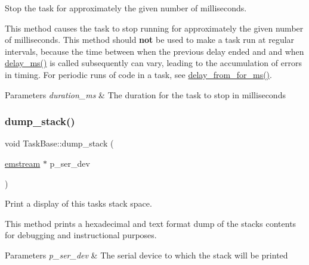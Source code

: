 Stop the task for approximately the given number of milliseconds. 

This method causes the task to stop running for approximately the given number of milliseconds. This method should {\bfseries not} be used to make a task run at regular intervals, because the time between when the previous delay ended and and when {\ttfamily \mbox{\hyperlink{class_task_base_a6a7e9bc3d85a0e71462002b85402d995}{delay\+\_\+ms()}}} is called subsequently can vary, leading to the accumulation of errors in timing. For periodic runs of code in a task, see {\ttfamily \mbox{\hyperlink{class_task_base_a31b1c01059c7ec4bfe60fc8332759551}{delay\+\_\+from\+\_\+for\+\_\+ms()}}}. 
\begin{DoxyParams}{Parameters}
{\em duration\+\_\+ms} & The duration for the task to stop in milliseconds \\
\hline
\end{DoxyParams}
\mbox{\label{class_task_base_a9e228e424048594a935cd31ae9e0eeb3}} 
\subsubsection{\texorpdfstring{dump\+\_\+stack()}{dump\_stack()}}
{\footnotesize\ttfamily void Task\+Base\+::dump\+\_\+stack (\begin{DoxyParamCaption}\item[{\mbox{\hyperlink{classemstream}{emstream}} $\ast$}]{p\+\_\+ser\+\_\+dev }\end{DoxyParamCaption})\hspace{0.3cm}{\ttfamily [inline]}}



Print a display of this task\textquotesingle{}s stack space. 

This method prints a hexadecimal and text format dump of the stack\textquotesingle{}s contents for debugging and instructional purposes. 
\begin{DoxyParams}{Parameters}
{\em p\+\_\+ser\+\_\+dev} & The serial device to which the stack will be printed \\
\hline
\end{DoxyParams}
\mbox{\label{class_task_base_a5842a497b5a274e6a40fae18bff03a9f}} 
